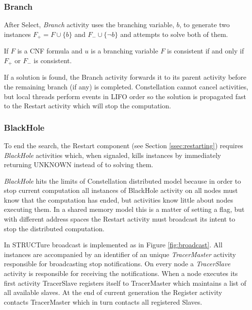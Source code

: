 \subsubsection{Branch}

After Select, \emph{Branch} activity uses the branching variable,
$b$, to generate two instances $F_+ = F \cup \{b\}$ and $F_- \cup
\{\neg b\}$ and attempts to solve both of them.

\begin{myprop}
  If $F$ is a CNF formula and $u$ is a branching variable
  $F$ is consistent if and only if $F_+$ or $F_-$ is consistent.
\end{myprop}

If a solution is found, the Branch activity forwards it to
its parent activity before the remaining branch (if any) is
completed. Constellation cannot cancel activities, but local threads
perform events in LIFO order so the solution is propagated fast to
the Restart activity which will stop the computation.


\subsubsection{BlackHole}
\label{sssec:blackhole}

To end the search, the Restart component (see Section
\ref{ssec:restarting}) requires \emph{BlackHole} activities which, when
signaled, kills instances by immediately returning \textsf{UNKNOWN}
instead of to solving them.

\emph{BlackHole} hits the limits of Constellation distributed
model because in order to stop current computation all instances of
BlackHole activity on all nodes must know that the computation has
ended, but activities know little about nodes executing them. In
a shared memory model this is a matter of setting a flag, but with
different address spaces the Restart activity must broadcast its
intent to stop the distributed computation.

In STRUCTure broadcast is implemented as in Figure
\ref{fig:broadcast}.  All instances are accompanied by an
identifier of an unique \emph{TracerMaster} activity responsible for
broadcasting stop notifications. On every node a \emph{TracerSlave}
activity is responsible for receiving the notifications. When a
node executes its first activity TracerSlave registers itself to
TracerMaster which maintains a list of all available slaves. At the
end of current generation the Register activity contacts TracerMaster
which in turn contacts all registered Slaves.

